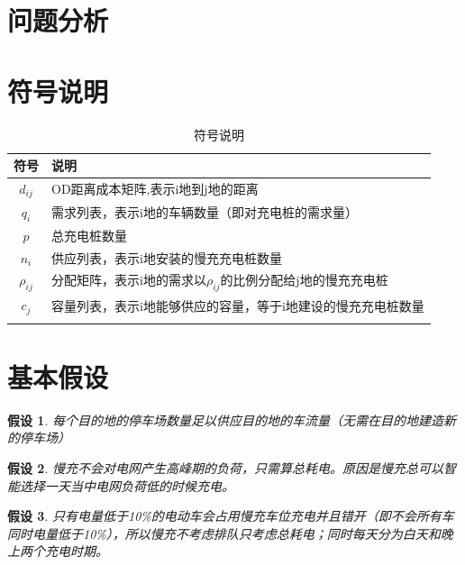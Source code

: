 \documentclass[12pt, a4paper, oneside]{ctexart}
\newtheorem{assumption}{假设}[section]
\begin{document}
    \section{问题分析}
    
    \section{符号说明}
    \begin{table}[h]
        \caption{符号说明}
        \centering
        \renewcommand{\arraystretch}{2}
        \begin{tabular*}{\textwidth}{c||l}%
          \toprule[1.5mm]
          \Large{\textbf{符号}} & \Large{\textbf{说明}} \\
          \midrule[1.5pt]
          \(d_{ij}\) & OD距离成本矩阵,表示i地到j地的距离 \\\hline
          \(q_i\)&需求列表，表示i地的车辆数量（即对充电桩的需求量）\\\hline
          \(p\)&总充电桩数量\\\hline
          \(n_i\)&供应列表，表示i地安装的慢充充电桩数量\\\hline
          \(\rho_{ij}\)&分配矩阵，表示i地的需求以\(\rho_{ij}\)的比例分配给j地的慢充充电桩\\\hline
          \(c_j\)&容量列表，表示i地能够供应的容量，等于i地建设的慢充充电桩数量\\\hline
          &\\\hline
          \bottomrule[1mm]
        \end{tabular*}
      \end{table}
    \section{基本假设}
    \begin{assumption}\label{asmp:lcpark}
        每个目的地的停车场数量足以供应目的地的车流量（无需在目的地建造新的停车场）
    \end{assumption}
    \begin{assumption}\label{asmp:lcload}
        慢充不会对电网产生高峰期的负荷，只需算总耗电。原因是慢充总可以智能选择一天当中电网负荷低的时候充电。
    \end{assumption}
    \begin{assumption}\label{asmp:lcoccupy}
        只有电量低于10\%的电动车会占用慢充车位充电并且错开（即不会所有车同时电量低于10\%），所以慢充不考虑排队只考虑总耗电；同时每天分为白天和晚上两个充电时期。
    \end{assumption}
    
\end{document}
